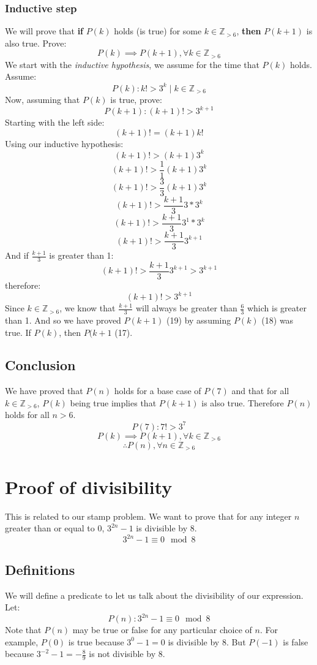 \documentclass{article}
\begin{document}
\subsubsection{Inductive step}
We will prove that \textbf{if} $P(k)$ holds (is true) for some $k \in \mathbb Z_{> 6}$, \textbf{then} $P(k + 1)$ is also true. Prove:
\begin{equation}
P(k) \implies P(k + 1), \forall k \in \mathbb Z_{> 6}
\end{equation}
We start with the \textit{inductive hypothesis}, we assume for the time that $P(k)$ holds. Assume:
\begin{equation}
P(k): k! > 3^k \mid k \in \mathbb Z_{> 6}
\end{equation}
Now, assuming that $P(k)$ is true, prove:
\begin{equation}
P(k + 1): (k + 1)! > 3^{k + 1}
\end{equation}
Starting with the left side:
\[ (k + 1)! = (k + 1) k! \]
Using our inductive hypothesis:
\[ (k + 1)! > (k + 1) 3^k \]
\[ (k + 1)! > \frac{1}{1} (k + 1) 3^k \]
\[ (k + 1)! > \frac{3}{3} (k + 1) 3^k \]
\[ (k + 1)! > \frac{k + 1}{3} 3 * 3^k \]
\[ (k + 1)! > \frac{k + 1}{3} 3^1 * 3^k \]
\[ (k + 1)! > \frac{k + 1}{3} 3^{k + 1} \]
And if $\frac{k + 1}{3}$ is greater than 1:
\[ (k + 1)! > \frac{k + 1}{3} 3^{k + 1} > 3^{k + 1} \]
therefore:
\[ (k + 1)! > 3^{k + 1} \]
Since $k \in \mathbb Z_{> 6}$, we know that $\frac{k + 1}{3}$ will always be greater than $\frac{6}{3}$ which is greater than 1.
And so we have proved $P(k + 1)$ (19) by assuming $P(k)$ (18) was true. If $P(k)$, then $P(k + 1$ (17).

\subsection{Conclusion}
We have proved that $P(n)$ holds for a base case of $P(7)$ and that for all $k \in \mathbb Z_{> 6}$, $P(k)$ being true implies that $P(k + 1)$ is also true. Therefore $P(n)$ holds for all $n > 6$.
\[P(7): 7! > 3^7 \]
\[P(k) \implies P(k + 1), \forall k \in  \mathbb Z_{> 6}\]
\[ \therefore P(n), \forall n \in \mathbb Z_{> 6} \]


\section{Proof of divisibility}
This is related to our stamp problem. We want to prove that for any integer $n$ greater than or equal to 0, $3^{2n} - 1$ is divisible by 8.
\[ 3^{2n} - 1 \equiv 0 \mod 8 \]
\subsection{Definitions}
We will define a predicate to let us talk about the divisibility of our expression. Let:
\begin{equation}
P(n): 3^{2n} - 1 \equiv 0 \mod 8
\end{equation}
Note that $P(n)$ may be true or false for any particular choice of $n$. For example, $P(0)$ is true because $3^0 - 1 = 0$ is divisible by 8. But $P(-1)$ is false because $3^{-2} - 1 = -\frac{8}{9}$ is not divisible by 8.
\end{document}

